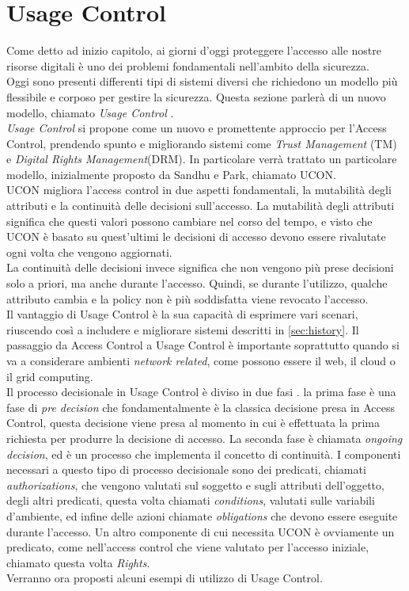 \section{Usage Control} %
\label{sec:usage_control}
Come detto ad inizio capitolo, ai giorni d'oggi proteggere l'accesso alle nostre risorse digitali è uno dei problemi fondamentali nell'ambito della sicurezza. \\
Oggi sono presenti differenti tipi di sistemi diversi che richiedono un modello più flessibile e corposo per gestire la sicurezza. Questa sezione parlerà di un nuovo modello, chiamato \textit{Usage Control} \cite{SurveyUsageControl}.\\
\textit{Usage Control} si propone come un nuovo e promettente approccio per l'Access Control, prendendo spunto e migliorando sistemi come \textit{Trust Management} (TM) e \textit{Digital Rights Management}(DRM). In particolare verrà trattato un particolare modello, inizialmente proposto da Sandhu e Park\cite{SurveyUsageControl}, chiamato UCON.\\
UCON migliora l'access control in due aspetti fondamentali, la mutabilità degli attributi e la continuità delle decisioni sull'accesso. La mutabilità degli attributi significa che questi valori possono cambiare nel corso del tempo, e visto che UCON è basato su quest'ultimi le decisioni di accesso devono essere rivalutate ogni volta che vengono aggiornati.\\
La continuità delle decisioni invece significa che non vengono più prese decisioni solo a priori, ma anche durante l'accesso. Quindi, se durante l'utilizzo, qualche attributo cambia e la policy non è più soddisfatta viene revocato l'accesso.\\
Il vantaggio di Usage Control è la sua capacità di esprimere vari scenari, riuscendo così a includere e migliorare sistemi descritti in \ref{sec:history}.
Il passaggio da Access Control a Usage Control è importante soprattutto quando si va a considerare ambienti \textit{network related}, come possono essere il web, il cloud o il grid computing.\\
Il processo decisionale in Usage Control è diviso in due fasi \cite{UsageControlCloud}. la prima fase è una fase di \textit{pre decision} che fondamentalmente è la classica decisione presa in Access Control, questa decisione viene presa al momento in cui è effettuata la prima richiesta per produrre la decisione di accesso.
La seconda fase è chiamata \textit{ongoing decision}, ed è un processo che implementa il concetto di continuità.
I componenti necessari a questo tipo di processo decisionale sono dei predicati, chiamati \textit{authorizations}, che vengono valutati sul soggetto e sugli attributi dell'oggetto, degli altri predicati, questa volta chiamati \textit{conditions}, valutati sulle variabili d'ambiente, ed infine delle azioni chiamate \textit{obligations} che devono essere eseguite durante l'accesso.
Un altro componente di cui necessita UCON è ovviamente un predicato, come nell'access control che viene valutato per l'accesso iniziale, chiamato questa volta \textit{Rights}.\\
Verranno ora proposti alcuni esempi di utilizzo di Usage Control.


